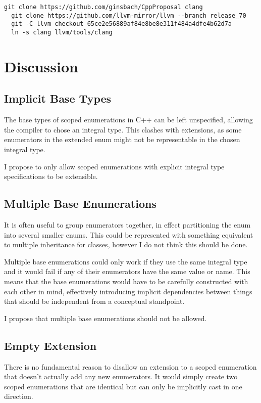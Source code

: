 \documentclass{scrartcl}
\begin{document}
{\footnotesize
\begin{lstlisting}[language={}]
  git clone https://github.com/ginsbach/CppProposal clang
  git clone https://github.com/llvm-mirror/llvm --branch release_70
  git -C llvm checkout 65ce2e56889af84e8be8e311f484a4dfe4b62d7a
  ln -s clang llvm/tools/clang
\end{lstlisting}}

\section*{Discussion}
\subsection*{Implicit Base Types}
The base types of scoped enumerations in C++ can be left unspecified, allowing
the compiler to chose an integral type.
This clashes with extensions, as some enumerators in the extended enum might not
be representable in the chosen integral type.

I propose to only allow scoped enumerations with explicit integral type
specifications to be extensible.

\subsection*{Multiple Base Enumerations}
It is often useful to group enumerators together, in effect partitioning the
enum into several smaller enums.
This could be represented with something equivalent to multiple inheritance for
classes, however I do not think this should be done.

Multiple base enumerations could only work if they use the same integral type
and it would fail if any of their enumerators have the same value or name.
This means that the base enumerations would have to be carefully constructed
with each other in mind, effectively introducing implicit dependencies between
things that should be independent from a conceptual standpoint.

I propose that multiple base enumerations should not be allowed.

\subsection*{Empty Extension}
There is no fundamental reason to disallow an extension to a scoped enumeration that doesn't actually add any new enumerators.
It would simply create two scoped enumerations that are identical but can only be implicitly cast in one direction.
\end{document}
